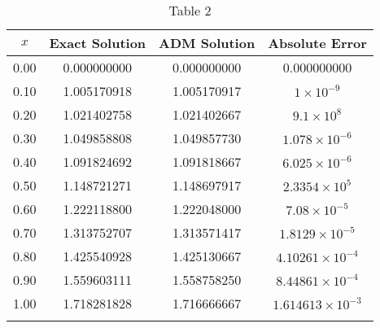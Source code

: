 \documentclass[11pt]{report}
\begin{document}
	\begin{longtable}{|c|c|c|c|}
		\hline
		$x$ & Exact Solution & ADM Solution & Absolute Error\\\hline
		0.00 & 0.000000000 & 0.000000000 & 0.000000000\\
		0.10 & 1.005170918 & 1.005170917 & $1\times10^{-9}$\\
		0.20 & 1.021402758 & 1.021402667 & $9.1\times10^{8}$\\
		0.30 & 1.049858808 & 1.049857730 & $1.078\times10^{-6}$\\
		0.40 & 1.091824692 & 1.091818667 & $6.025\times10^{-6}$\\
		0.50 & 1.148721271 & 1.148697917 & $2.3354\times10^{5}$\\
		0.60 & 1.222118800 & 1.222048000 & $7.08\times10^{-5}$\\
		0.70 & 1.313752707 & 1.313571417 & $1.8129\times10^{-5}$\\
		0.80 & 1.425540928 & 1.425130667 & $4.10261\times10^{-4}$\\
		0.90 & 1.559603111 & 1.558758250 & $8.44861\times10^{-4}$\\
		1.00 & 1.718281828 & 1.716666667 & $1.614613\times10^{-3}$\\\hline
		\caption{Table 2}
	\end{longtable}
	
\end{document}
